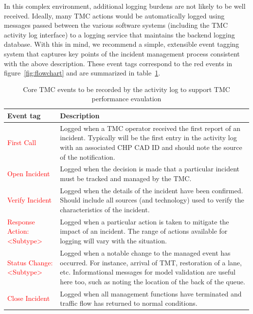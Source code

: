 \documentclass[12pt]{report}
\begin{document}
In this complex environment, additional logging burdens are not likely to be
well received.  Ideally, many TMC actions would be automatically logged using
messages passed between the various software systems (including the TMC activity
log interface) to a logging service that maintains the backend logging database.
With this in mind, we recommend a simple, extensible event tagging system that
captures key points of the incident management process consistent with the above
description.  These event tags correspond to the red events in
figure~\ref{fig:flowchart} and are summarized in
table~\ref{tab:tmc-event-summary}.
\begin{table}[ht]
  \centering
 \footnotesize
\begin{tabularx}{\textwidth}{lX}
  \hline
  \textbf{Event tag} & \textbf{Description}\\
  \hline {\sc \textcolor{red}{First Call}} & Logged when a TMC
  operator received the first report of an incident.  Typically will
  be the first entry in the activity log with an associated CHP CAD ID
  and should note the source of the notification.  \\
  {\sc \textcolor{red}{Open Incident}} & Logged when the decision is
  made that a particular incident must be tracked and
  managed by the TMC.\\
  {\sc \textcolor{red}{Verify Incident}} & Logged when the details of
  the incident have been confirmed.  Should include all sources (and
  technology) used to verify the characteristics of the incident.  \\
  {\sc \textcolor{red}{Response Action:<Subtype>}} & Logged when a
  particular action is taken to mitigate the impact of an incident.
  The range of actions available for logging will vary with the
  situation.\\
  {\sc \textcolor{red}{Status Change:<Subtype>}} & Logged when a
  notable change to the managed event has occurred.  For instance,
  arrival of TMT, restoration of a lane, etc.  Informational messages
  for model validation are useful here too, such as noting the
  location of the back of the queue.\\
  {\sc \textcolor{red}{Close Incident}} & Logged when all management
  functions have terminated and traffic flow has returned to normal
  conditions. \\
  \hline
\end{tabularx}
  \caption{Core TMC events to be recorded by the activity log to support TMC performance evaulation}
  \label{tab:tmc-event-summary}
\end{table}
\end{document}
